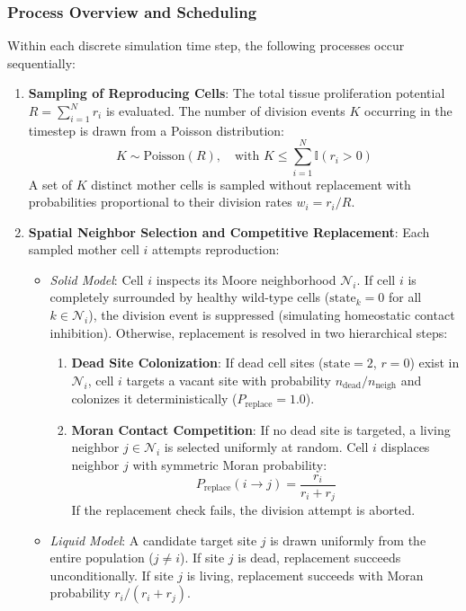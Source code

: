 \documentclass[11pt,a4paper]{article}
\begin{document}
\subsubsection{Process Overview and Scheduling}
Within each discrete simulation time step, the following processes occur sequentially:
\begin{enumerate}
    \item \textbf{Sampling of Reproducing Cells}: The total tissue proliferation potential $R = \sum_{i=1}^N r_i$ is evaluated. The number of division events $K$ occurring in the timestep is drawn from a Poisson distribution:
    \begin{equation}
        K \sim \text{Poisson}(R), \quad \text{with } K \le \sum_{i=1}^N \mathbb{I}(r_i > 0)
    \end{equation}
    A set of $K$ distinct mother cells is sampled without replacement with probabilities proportional to their division rates $w_i = r_i / R$.
    
    \item \textbf{Spatial Neighbor Selection and Competitive Replacement}:
    Each sampled mother cell $i$ attempts reproduction:
    \begin{itemize}
        \item \textit{Solid Model}: Cell $i$ inspects its Moore neighborhood $\mathcal{N}_i$. If cell $i$ is completely surrounded by healthy wild-type cells ($\text{state}_k = 0$ for all $k \in \mathcal{N}_i$), the division event is suppressed (simulating homeostatic contact inhibition). Otherwise, replacement is resolved in two hierarchical steps:
        \begin{enumerate}
            \item \textbf{Dead Site Colonization}: If dead cell sites ($\text{state} = 2$, $r = 0$) exist in $\mathcal{N}_i$, cell $i$ targets a vacant site with probability $n_{\text{dead}} / n_{\text{neigh}}$ and colonizes it deterministically ($P_{\text{replace}} = 1.0$).
            \item \textbf{Moran Contact Competition}: If no dead site is targeted, a living neighbor $j \in \mathcal{N}_i$ is selected uniformly at random. Cell $i$ displaces neighbor $j$ with symmetric Moran probability:
            \begin{equation}
                P_{\text{replace}}(i \to j) = \frac{r_i}{r_i + r_j}
            \end{equation}
            If the replacement check fails, the division attempt is aborted.
        \end{enumerate}
        \item \textit{Liquid Model}: A candidate target site $j$ is drawn uniformly from the entire population ($j \neq i$). If site $j$ is dead, replacement succeeds unconditionally. If site $j$ is living, replacement succeeds with Moran probability $r_i / (r_i + r_j)$.
    \end{itemize}
    

\end{enumerate}
\end{document}
